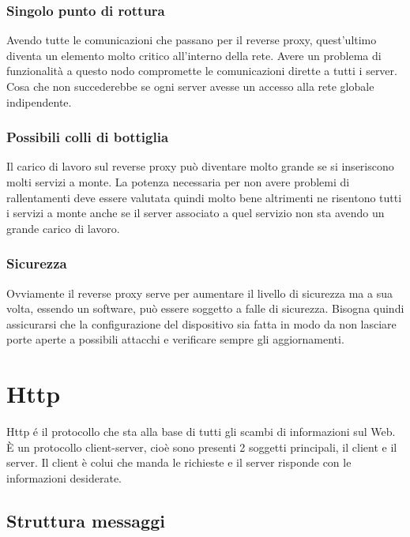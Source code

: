 \subsubsection{Singolo punto di rottura}
Avendo tutte le comunicazioni che passano per il reverse proxy, quest'ultimo diventa un elemento molto critico all'interno della rete. Avere un problema di funzionalità a questo nodo compromette le comunicazioni dirette a tutti i server. Cosa che non succederebbe se ogni server avesse un accesso alla rete globale indipendente.
\subsubsection{Possibili colli di bottiglia}
Il carico di lavoro sul reverse proxy può diventare molto grande se si inseriscono molti servizi a monte. La potenza necessaria per non avere problemi di rallentamenti deve essere valutata quindi molto bene altrimenti ne risentono tutti i servizi a monte anche se il server associato a quel servizio non sta avendo un grande carico di lavoro.
\subsubsection{Sicurezza}
Ovviamente il reverse proxy serve per aumentare il livello di sicurezza ma a sua volta, essendo un software, può essere soggetto a falle di sicurezza. Bisogna quindi assicurarsi che la configurazione del dispositivo sia fatta in modo da non lasciare porte aperte a possibili attacchi e verificare sempre gli aggiornamenti.


\section{Http}
\cite{http}
Http é il protocollo che sta alla base di tutti gli scambi di informazioni sul Web. È un protocollo client-server, cioè sono presenti 2 soggetti principali, il client e il server. Il client è colui che manda le richieste e il server risponde con le informazioni desiderate.
\subsection{Struttura messaggi}
